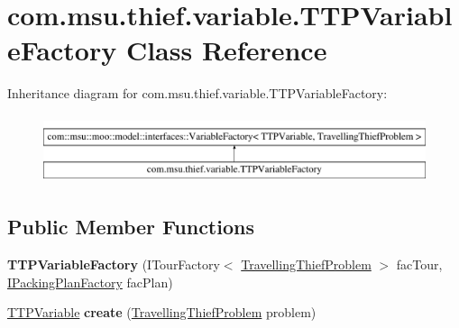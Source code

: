 \hypertarget{classcom_1_1msu_1_1thief_1_1variable_1_1TTPVariableFactory}{\section{com.\-msu.\-thief.\-variable.\-T\-T\-P\-Variable\-Factory Class Reference}
\label{classcom_1_1msu_1_1thief_1_1variable_1_1TTPVariableFactory}
}
Inheritance diagram for com.\-msu.\-thief.\-variable.\-T\-T\-P\-Variable\-Factory\-:\begin{figure}[H]
\begin{center}
\leavevmode
\includegraphics[height=2.000000cm]{classcom_1_1msu_1_1thief_1_1variable_1_1TTPVariableFactory}
\end{center}
\end{figure}
\subsection*{Public Member Functions}
\begin{DoxyCompactItemize}
\item 
\hypertarget{classcom_1_1msu_1_1thief_1_1variable_1_1TTPVariableFactory_a3c468c8106750307127d7710613429b6}{{\bfseries T\-T\-P\-Variable\-Factory} (I\-Tour\-Factory$<$ \hyperlink{classcom_1_1msu_1_1thief_1_1problems_1_1TravellingThiefProblem}{Travelling\-Thief\-Problem} $>$ fac\-Tour, \hyperlink{interfacecom_1_1msu_1_1thief_1_1model_1_1packing_1_1IPackingPlanFactory}{I\-Packing\-Plan\-Factory} fac\-Plan)}\label{classcom_1_1msu_1_1thief_1_1variable_1_1TTPVariableFactory_a3c468c8106750307127d7710613429b6}

\item 
\hypertarget{classcom_1_1msu_1_1thief_1_1variable_1_1TTPVariableFactory_a8af6b49ffdf1fe58ffc203f2f7f71e8e}{\hyperlink{classcom_1_1msu_1_1thief_1_1variable_1_1TTPVariable}{T\-T\-P\-Variable} {\bfseries create} (\hyperlink{classcom_1_1msu_1_1thief_1_1problems_1_1TravellingThiefProblem}{Travelling\-Thief\-Problem} problem)}\label{classcom_1_1msu_1_1thief_1_1variable_1_1TTPVariableFactory_a8af6b49ffdf1fe58ffc203f2f7f71e8e}

\end{DoxyCompactItemize}
